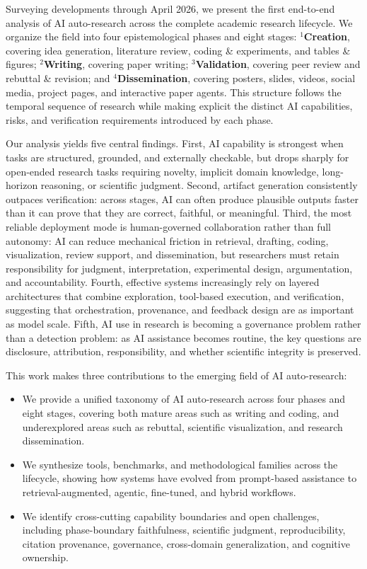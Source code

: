 \documentclass{llmxive}
\begin{document}
Surveying developments through April 2026, we present the first end-to-end analysis of AI auto-research across the complete academic research lifecycle. We organize the field into four epistemological phases and eight stages: $^1$\textbf{Creation}, covering idea generation, literature review, coding \& experiments, and tables \& figures; $^2$\textbf{Writing}, covering paper writing; $^3$\textbf{Validation}, covering peer review and rebuttal \& revision; and $^4$\textbf{Dissemination}, covering posters, slides, videos, social media, project pages, and interactive paper agents. This structure follows the temporal sequence of research while making explicit the distinct AI capabilities, risks, and verification requirements introduced by each phase.

Our analysis yields five central findings. First, AI capability is strongest when tasks are structured, grounded, and externally checkable, but drops sharply for open-ended research tasks requiring novelty, implicit domain knowledge, long-horizon reasoning, or scientific judgment. Second, artifact generation consistently outpaces verification: across stages, AI can often produce plausible outputs faster than it can prove that they are correct, faithful, or meaningful. Third, the most reliable deployment mode is human-governed collaboration rather than full autonomy: AI can reduce mechanical friction in retrieval, drafting, coding, visualization, review support, and dissemination, but researchers must retain responsibility for judgment, interpretation, experimental design, argumentation, and accountability. Fourth, effective systems increasingly rely on layered architectures that combine exploration, tool-based execution, and verification, suggesting that orchestration, provenance, and feedback design are as important as model scale. Fifth, AI use in research is becoming a governance problem rather than a detection problem: as AI assistance becomes routine, the key questions are disclosure, attribution, responsibility, and whether scientific integrity is preserved.

This work makes three contributions to the emerging field of AI auto-research:

\begin{itemize}

    \item We provide a unified taxonomy of AI auto-research across four phases and eight stages, covering both mature areas such as writing and coding, and underexplored areas such as rebuttal, scientific visualization, and research dissemination.

    \item We synthesize tools, benchmarks, and methodological families across the lifecycle, showing how systems have evolved from prompt-based assistance to retrieval-augmented, agentic, fine-tuned, and hybrid workflows.

    \item We identify cross-cutting capability boundaries and open challenges, including phase-boundary faithfulness, scientific judgment, reproducibility, citation provenance, governance, cross-domain generalization, and cognitive ownership.
\end{itemize}
\end{document}
